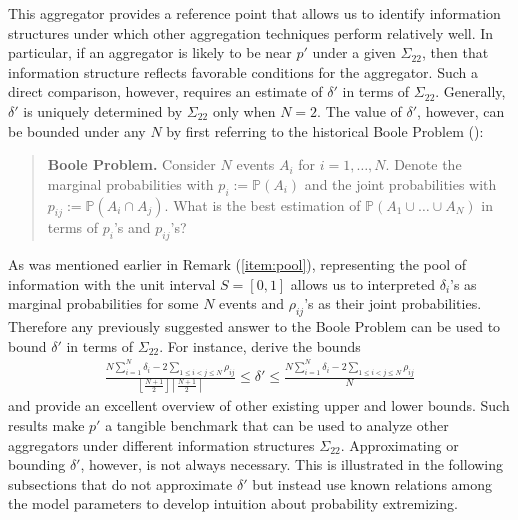 \documentclass[11pt]{article}
\renewcommand{\P}{\mathbb{P}}
\theoremstyle{definition}
\theoremstyle{definition}
\def\P{{\mathbb P}}
\begin{document}
This aggregator provides a reference point that allows us to identify information structures under which other aggregation techniques perform relatively well. In particular, if an aggregator is likely to be near $p'$ under a given $\Sigma_{22}$, then that information structure reflects favorable conditions for the aggregator. Such a direct comparison, however, requires an estimate of $\delta'$ in terms of $\Sigma_{22}$. Generally, $\delta'$ is uniquely determined by $\Sigma_{22}$ only when $N = 2$. 
The value of $\delta'$, however, can be bounded under any $N$ by first referring to the historical Boole Problem (\citealt{boole1854investigation}): 

\begin{quote}
\textbf{Boole Problem.} Consider $N$ events $A_i$ for $i = 1, \dots, N$. Denote the marginal probabilities  with $p_i := \P(A_i)$ and the joint probabilities with $p_{ij} := \P(A_i \cap A_j)$. What is the best estimation of $\P(A_1 \cup \dots \cup A_N)$ in terms of $p_i$'s and $p_{ij}$'s?
\end{quote}
As was mentioned earlier in Remark (\ref{item:pool}), representing the pool of information with the unit interval $S = [0,1]$ allows us to interpreted $\delta_i$'s as marginal probabilities for some $N$ events and $\rho_{ij}$'s as their joint probabilities. Therefore  any previously suggested answer to the Boole Problem can be used to bound $\delta'$ in terms of $\Sigma_{22}$. For instance, \cite{deza1997geometry} derive the bounds
\begin{align*}
\frac{N \sum_{i=1}^N \delta_i - 2 \sum_{1 \leq i < j \leq N} \rho_{ij}}{\left\lfloor \frac{N+1}{2} \right\rfloor \left\lceil \frac{N+1}{2} \right\rceil }  \leq \delta' \leq \frac{N \sum_{i=1}^N \delta_i - 2 \sum_{1 \leq i < j \leq N} \rho_{ij}}{N} 
\end{align*}
and provide an excellent overview of other existing upper and lower bounds. 
Such results make $p'$ a tangible benchmark that can be used to analyze other aggregators under different information structures $\Sigma_{22}$. Approximating or bounding $\delta'$, however, is not always necessary. This is illustrated in the following subsections that do not approximate $\delta'$ but instead use known relations among the model parameters to develop intuition about probability extremizing. 
\end{document}
